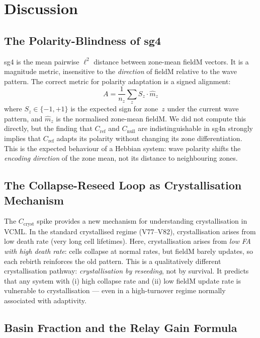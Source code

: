 \documentclass[11pt]{article}
\begin{document}
\section{Discussion}

\subsection{The Polarity-Blindness of sg4}

sg4 is the mean pairwise $\ell^2$ distance between zone-mean fieldM vectors.
It is a magnitude metric, insensitive to the \emph{direction} of fieldM
relative to the wave pattern.
The correct metric for polarity adaptation is a signed alignment:
\begin{equation}
  A = \frac{1}{n_z}\sum_z S_z \cdot \hat{m}_z
\end{equation}
where $S_z \in \{-1,+1\}$ is the expected sign for zone~$z$ under the
current wave pattern, and $\hat{m}_z$ is the normalised zone-mean fieldM.
We did not compute this directly, but the finding that $C_\mathrm{ref}$
and $C_\mathrm{null}$ are indistinguishable in sg4n strongly implies that
$C_\mathrm{ref}$ adapts its polarity without changing its zone differentiation.
This is the expected behaviour of a Hebbian system: wave polarity shifts
the \emph{encoding direction} of the zone mean, not its distance to
neighbouring zones.

\subsection{The Collapse-Reseed Loop as Crystallisation Mechanism}

The $C_\mathrm{cryst}$ spike provides a new mechanism for understanding
crystallisation in VCML.
In the standard crystallised regime (V77--V82), crystallisation arises from
low death rate (very long cell lifetimes).
Here, crystallisation arises from \emph{low FA with high death rate}: cells
collapse at normal rates, but fieldM barely updates, so each rebirth
reinforces the old pattern.
This is a qualitatively different crystallisation pathway:
\textit{crystallisation by reseeding}, not by survival.
It predicts that any system with (i) high collapse rate and (ii) low
fieldM update rate is vulnerable to crystallisation --- even in a
high-turnover regime normally associated with adaptivity.

\subsection{Basin Fraction and the Relay Gain Formula}
\end{document}
